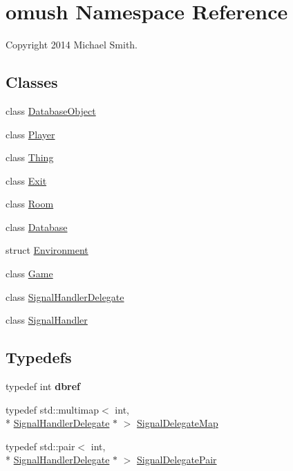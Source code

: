 \hypertarget{namespaceomush}{\section{omush Namespace Reference}
\label{namespaceomush}
}


Copyright 2014 Michael Smith.  


\subsection*{Classes}
\begin{DoxyCompactItemize}
\item 
class \hyperlink{classomush_1_1_database_object}{Database\-Object}
\item 
class \hyperlink{classomush_1_1_player}{Player}
\item 
class \hyperlink{classomush_1_1_thing}{Thing}
\item 
class \hyperlink{classomush_1_1_exit}{Exit}
\item 
class \hyperlink{classomush_1_1_room}{Room}
\item 
class \hyperlink{classomush_1_1_database}{Database}
\item 
struct \hyperlink{structomush_1_1_environment}{Environment}
\item 
class \hyperlink{classomush_1_1_game}{Game}
\item 
class \hyperlink{classomush_1_1_signal_handler_delegate}{Signal\-Handler\-Delegate}
\item 
class \hyperlink{classomush_1_1_signal_handler}{Signal\-Handler}
\end{DoxyCompactItemize}
\subsection*{Typedefs}
\begin{DoxyCompactItemize}
\item 
\hypertarget{namespaceomush_a4f95cdc9f7b25130afd760fb7f175dcc}{typedef int {\bfseries dbref}}\label{namespaceomush_a4f95cdc9f7b25130afd760fb7f175dcc}

\item 
typedef std\-::multimap$<$ int, \\*
\hyperlink{classomush_1_1_signal_handler_delegate}{Signal\-Handler\-Delegate} $\ast$ $>$ \hyperlink{namespaceomush_a1d7529318966c643d1dd1eec7d619ebc}{Signal\-Delegate\-Map}
\item 
typedef std\-::pair$<$ int, \\*
\hyperlink{classomush_1_1_signal_handler_delegate}{Signal\-Handler\-Delegate} $\ast$ $>$ \hyperlink{namespaceomush_ac30cad3dc5c8f3a450a56b1fcc88028d}{Signal\-Delegate\-Pair}
\end{DoxyCompactItemize}
